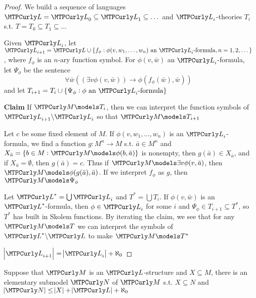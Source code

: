 \documentclass[11pt]{article}
\begin{document}
\begin{proof}
We build a sequence of languages
\(\call=\call_0\subseteq\call_1\subseteq\dots\) and \(\call_i\)-theories
\(T_i\) s.t. \(T=T_0\subseteq T_1\subseteq\dots\)

Given \(\call_i\), let
\(\call_{i+1}=\call\cup\{f_\phi:\phi(v,w_1,\dots,w_n)\text{ an
   }\call_i\text{-formula},n=1,2,\dots\}\), 
where \(f_\phi\) is an \(n\)-ary function symbol. For \(\phi(v,\bar{w})\) an
\(\call_i\)-formula, let \(\Psi_\phi\) be the sentence
\begin{equation*}
\forall\bar{w}((\exists v\phi(v,\bar{w}))\to\phi(f_\phi(\bar{w}),\bar{w}))
\end{equation*}
and let \(T_{i+1}=T_i\cup\{\Psi_\phi:\phi\text{ an
   }\call_i\text{-formula}\}\)

\textbf{Claim} If \(\calm\models T_i\), then we can interpret the function symbols of
\(\call_{i+1}\backslash\call_i\) so that \(\calm\models T_{i+1}\)

Let \(c\) be some fixed element of \(M\). If \(\phi(v,w_1,\dots,w_n)\) is an
\(\call_i\)-formula, we find a function \(g:M^n\to M\) s.t. 
\(\bar{a}\in M^n\) and \(X_{\bar{a}}=\{b\in M:\calm\models\phi(b,\bar{a})\}\)
is nonempty, then \(g(\bar{a})\in X_{\bar{a}}\), and if
\(X_{\bar{a}}=\emptyset\), then \(g(\bar{a})=c\). Thus if 
\(\calm\models\exists v\phi(v,\bar{a})\), then
\(\calm\models\phi(g(\bar{a}),\bar{a})\). If we interpret \(f_\phi\) as
\(g\), then \(\calm\models\Psi_\phi\)

Let \(\call^*=\bigcup\call_i\) and \(T^*=\bigcup T_i\). If \(\phi(v,\bar{w})\)
is an \(\call^*\)-formula, then \(\phi\in\call_i\) for some \(i\) and 
\(\Psi_\phi\in T_{i+1}\subseteq T^*\), so \(T^*\) has built in Skolem
functions. By iterating the claim, we see that for any \(\calm\models T\) we
can interpret the symbols of \(\call^*\backslash\call\) to make
\(\calm\models T^*\)

\(\abs{\call_{i+1}}=\abs{\call_i}+\aleph_0\)
\end{proof}

\begin{theorem}
Suppose that \(\calm\) is an \(\call\)-structure and \(X\subseteq M\), there
is an elementary submodel \(\caln\) of \(\calm\) s.t. \(X\subseteq N\) and 
\(\abs{\caln}\le\abs{X}+\abs{\call}+\aleph_0\)
\end{theorem}
\end{document}
